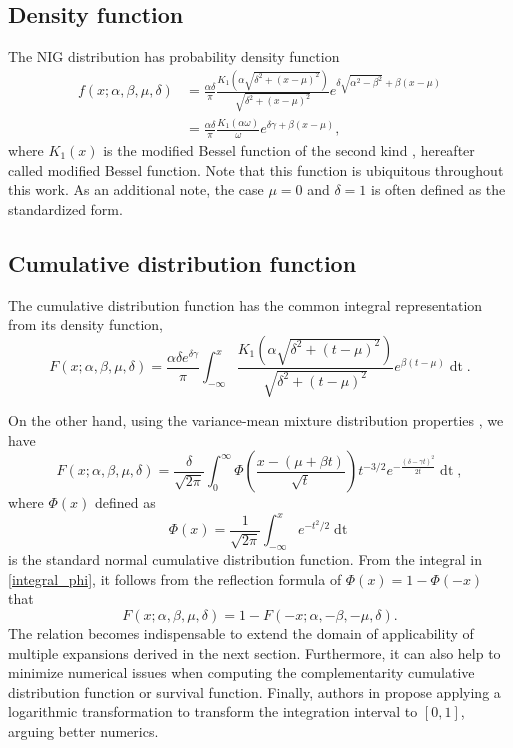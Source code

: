 \documentclass[10pt,a4paper,oneside]{article}
\numberwithin{equation}{section}
\begin{document}
\subsection{Density function}
The NIG distribution has probability density function
\begin{align}
f(x; \alpha, \beta, \mu, \delta) &= \frac{\alpha \delta}{\pi} \frac{K_1\left(\alpha\sqrt{\delta^2 + (x-\mu)^2}\right)}{\sqrt{\delta^2 + (x-\mu)^2}} e^{\delta \sqrt{\alpha^2 - \beta^2} + \beta(x-\mu)}\nonumber\\
&= \frac{\alpha \delta}{\pi} \frac{K_1\left(\alpha\omega\right)}{\omega} e^{\delta \gamma + \beta(x-\mu)},
\end{align}
where $K_1(x)$ is the modified Bessel function of the second kind \cite[\S 10]{NIST:DLMF},  hereafter called modified Bessel function. Note that this function is ubiquitous throughout this work. As an additional note, the case $\mu = 0$ and $\delta = 1$ is often defined as the standardized form.

\subsection{Cumulative distribution function}\label{properties_cdf}
The cumulative distribution function has the common integral representation from its density function,
\begin{equation}\label{integral_k1}
F(x; \alpha, \beta, \mu, \delta) = \frac{\alpha \delta e^{\delta \gamma}}{\pi} \int_{-\infty}^{x} \frac{K_1\left(\alpha\sqrt{\delta^2 + (t-\mu)^2}\right)}{\sqrt{\delta^2 + (t-\mu)^2}} e^{\beta(t-\mu)} \mathop{dt}.
\end{equation}

On the other hand, using the variance-mean mixture distribution properties \cite[\S 9]{Paolella2007}, we have
\begin{equation}\label{integral_phi}
F(x; \alpha, \beta, \mu, \delta) = \frac{\delta}{\sqrt{2\pi}}\int_{0}^{\infty} \Phi\left(\frac{x - (\mu +\beta t)}{\sqrt{t}}\right) t^{-3/2} e^{-\frac{(\delta - \gamma t)^2}{2t}} \mathop{dt},
\end{equation}
where $\Phi(x)$ defined as
\begin{equation*}
\Phi(x) = \frac{1}{\sqrt{2\pi}}\int_{-\infty}^x e^{-t^2 / 2} \mathop{dt}
\end{equation*}
is the standard normal cumulative distribution function. From the integral in \eqref{integral_phi}, it follows from the reflection formula of $\Phi(x) = 1 - \Phi(-x)$ that
\begin{equation}\label{cdf_mirror}
F(x; \alpha, \beta, \mu, \delta) = 1- F(-x; \alpha, -\beta, -\mu, \delta).
\end{equation}
The relation becomes indispensable to extend the domain of applicability of multiple expansions derived in the next section. Furthermore, it can also help to minimize numerical issues when computing the complementarity cumulative distribution function or survival function. Finally, authors in \cite{Kalemanova2007} propose applying a logarithmic transformation to transform the integration interval to $[0, 1]$, arguing better numerics.
\end{document}
